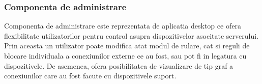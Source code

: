\subsubsection{Componenta de administrare}
Componenta de administrare este reprezentata de aplicatia desktop ce ofera
flexibilitate utilizatorilor pentru control asupra dispozitivelor asocitate
serverului. Prin aceasta un utilizator poate modifica atat modul de rulare, cat
si reguli de blocare individuala a conexiunilor externe ce au fost, sau pot fi
in legatura cu dispozitivele. De asemenea, ofera posibilitatea de vizualizare de
tip graf a conexiunilor care au fost facute cu dispozitivele suport.